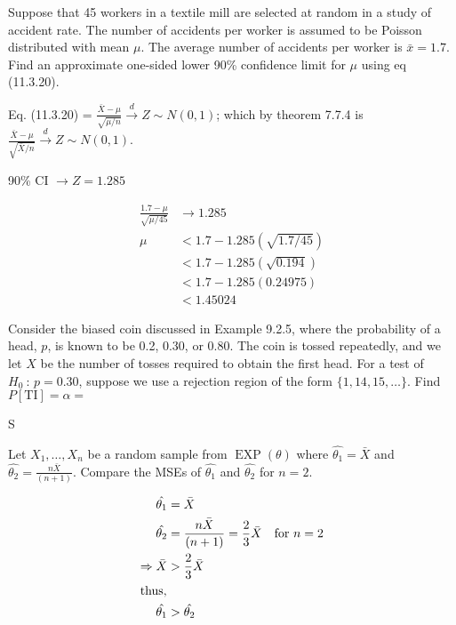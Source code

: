 \documentclass[answers]{exam}
\begin{document}
\begin{questions}
\question 
Suppose that 45 workers in a textile mill are selected at random in a study of accident rate. 
The number of accidents per worker is assumed to be Poisson distributed with mean \(\mu\). 
The average number of accidents per worker is \(\bar{x}=1.7\).
Find an approximate one-sided lower 90\% confidence limit for \(\mu\) 
using eq (11.3.20).
\begin{solution}
	Eq. (11.3.20) = \(\frac{\bar{X}-\mu}{\sqrt{\mu/n}}\overset{d}{\rightarrow} Z\sim N(0,1)\); 
	which by theorem 7.7.4 is 
	\(\frac{\bar{X}-\mu}{\sqrt{\bar{X}/n}}\overset{d}{\rightarrow} Z\sim N(0,1)\).
	
	90\% CI $\rightarrow Z = 1.285$ 
	
	\begin{align}
		\frac{1.7-\mu}{\sqrt{\mu/45}} &\rightarrow 1.285 \\
		\mu &< 1.7-1.285(\sqrt{1.7/45}) \\
		&< 1.7-1.285(\sqrt{0.194}) \\
		&< 1.7-1.285(0.24975) \\
		&< 1.45024
	\end{align}
\end{solution}

\question 
Consider the biased coin discussed in Example 9.2.5, where the probability of a head, 
\(p\), is known to be 0.2, 0.30, or 0.80. 
The coin is tossed repeatedly, 
and we let \(X\) be the number of tosses required to obtain the first head. 
For a test of \(H_0\ :\,p=0.30\), suppose we use a rejection region of the form
\(\{1,14,15,\ldots\}\). Find \(P\left[\text{TI}\right]=\alpha=\)
\begin{solution}
	S
	
\end{solution}

\question 
Let \(X_1,\ldots,X_n\) be a random sample from \(\operatorname{EXP}(\theta)\) where \(\hat{\theta_1}=\bar{X}\) and \(\hat{\theta_2}=\frac{n\bar{X}}{(n+1)}\). 
Compare the MSEs of \(\hat{\theta_1}\) and \(\hat{\theta_2}\) for \(n=2\).
\begin{solution}
	\begin{align*}
		\hat{\theta_1} &= \bar{X} \\
		\hat{\theta_2} & = \frac{n\bar{X}}{(n+1)} 
		= \frac{2}{3}\bar{X} \quad \text{for } n=2 \\
		\Rightarrow \bar{X} &> \frac{2}{3}\bar{X} \\
		\intertext{thus,}
		\hat{\theta_1} &> \hat{\theta_2}
	\end{align*}
	

\end{solution}
\end{questions}
\end{document}
